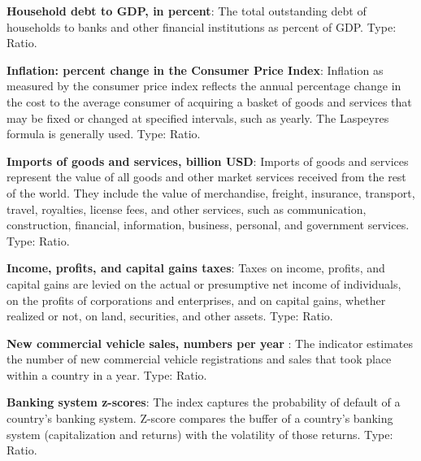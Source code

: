 \documentclass[11pt]{article}
\begin{document}
\begin{appendices}
\textbf{Household debt to GDP, in percent}: The total outstanding debt of households to banks and other financial institutions as percent of GDP. Type: Ratio.

\textbf{Inflation: percent change in the Consumer Price Index}: Inflation as measured by the consumer price index reflects the annual percentage change in the cost to the average consumer of acquiring a basket of goods and services that may be fixed or changed at specified intervals, such as yearly. The Laspeyres formula is generally used. Type: Ratio.

\textbf{Imports of goods and services, billion USD}: Imports of goods and services represent the value of all goods and other market services received from the rest of the world. They include the value of merchandise, freight, insurance, transport, travel, royalties, license fees, and other services, such as communication, construction, financial, information, business, personal, and government services. Type: Ratio.

\textbf{Income, profits, and capital gains taxes}: Taxes on income, profits, and capital gains are levied on the actual or presumptive net income of individuals, on the profits of corporations and enterprises, and on capital gains, whether realized or not, on land, securities, and other assets. Type: Ratio.

\textbf{New commercial vehicle sales, numbers per year }: The indicator estimates the number of new commercial vehicle registrations and sales that took place within a country in a year. Type: Ratio.

\textbf{Banking system z-scores}: The index captures the probability of default of a country's banking system. Z-score compares the buffer of a country's banking system (capitalization and returns) with the volatility of those returns. Type: Ratio.


\end{appendices}
\end{document}
